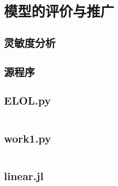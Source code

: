 



\section{模型的评价与推广} %
\label{sec:模型的评价与推广}


\subsection{灵敏度分析} %
\label{sub:灵敏度分析}






\printbibliography
\newpage
\begin{appendices}

\section{源程序}


\subsection{ELOL.py} %
\begin{lstlisting}[language=python]

\end{lstlisting}

\subsection{work1.py}

\begin{lstlisting}[language=python]


\end{lstlisting}

\subsection{linear.jl}

\begin{lstlisting}

\end{lstlisting}
\end{appendices}